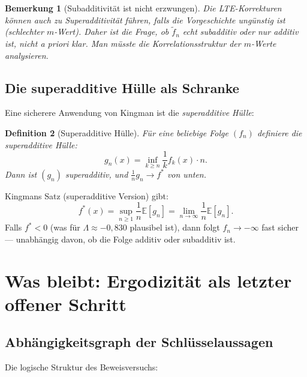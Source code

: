 \documentclass[12pt,a4paper]{article}
\newtheorem{definition}{Definition}[section]
\newtheorem{bemerkung}[definition]{Bemerkung}
\begin{document}
\begin{bemerkung}[Subadditivität ist nicht erzwungen]
Die LTE-Korrekturen können auch zu \emph{Superadditivität} führen, falls
die Vorgeschichte ungünstig ist (schlechter $m$-Wert). Daher ist die
Frage, ob $\tilde{f}_n$ echt subadditiv oder nur additiv ist, nicht a priori
klar. Man müsste die Korrelationsstruktur der $m$-Werte analysieren.
\end{bemerkung}

\subsection{Die superadditive Hülle als Schranke}

Eine sicherere Anwendung von Kingman ist die \emph{superadditive Hülle}:

\begin{definition}[Superadditive Hülle]
Für eine beliebige Folge $(f_n)$ definiere die superadditive Hülle:
\[
  g_n(x) = \inf_{k \geq n}\frac{1}{k}f_k(x)\cdot n.
\]
Dann ist $(g_n)$ superadditiv, und $\frac{1}{n}g_n \to f^*$ von unten.
\end{definition}

Kingmans Satz (superadditive Version) gibt:
\[
  f^*(x) = \sup_{n \geq 1}\frac{1}{n}\mathbb{E}[g_n]
  = \lim_{n\to\infty}\frac{1}{n}\mathbb{E}[g_n].
\]
Falls $f^* < 0$ (was für $\Lambda \approx -0{,}830$ plausibel ist), dann
folgt $f_n \to -\infty$ fast sicher --- unabhängig davon, ob die Folge
additiv oder subadditiv ist.

\section{Was bleibt: Ergodizität als letzter offener Schritt}
\label{sec:offen}

\subsection{Abhängigkeitsgraph der Schlüsselaussagen}

Die logische Struktur des Beweisversuchs:
\end{document}
